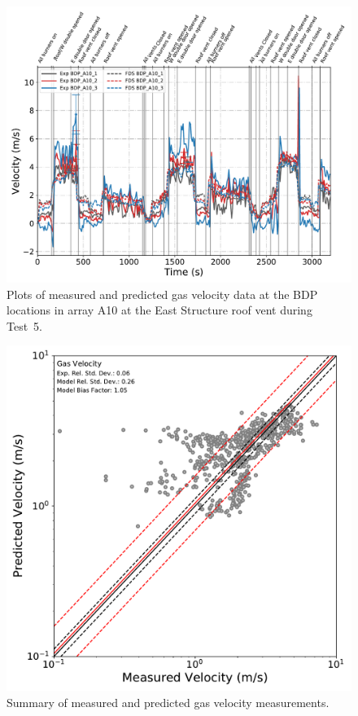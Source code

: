 \begin{figure}[!h]
	\centering
	\includegraphics[width=\columnwidth]{Figures/Plots/Validation/Velocity/Test_5_BDP_A10}
	\caption[Plots of measured and predicted gas velocity data at BDP locations in A10 during Test~5.]{Plots of measured and predicted gas velocity data at the BDP locations in array A10 at the East Structure roof vent during Test~5.}
	\label{fig:Test5_BDPs}
\end{figure}

\begin{figure}[!h]
	\centering
	\includegraphics[width=\columnwidth]{Figures/Plots/Validation/Velocity/loglog_BDPs}
	\caption{Summary of measured and predicted gas velocity measurements.}
	\label{fig:loglog_BDPs}
\end{figure}

